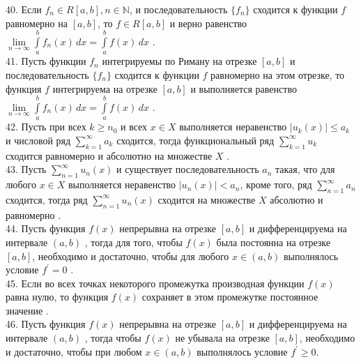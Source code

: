 \documentclass[12pt]{article}
\begin{document}
{{40. Если ${\displaystyle f_n \in R[a,b], n \in \mathbb{N}}$, и последовательность ${\displaystyle \{f_n\}}$ сходится к функции ${\displaystyle f}$ равномерно на ${\displaystyle [a,b]}$, то ${\displaystyle f \in R[a,b]}$ и верно равенство ${\displaystyle \lim \limits _{n \to \infty} \int \limits _{a}^{b} f_n(x) \, dx=\int \limits _{a}^{b} f(x) \, dx}$ .\\

41. Пусть функции ${\displaystyle f_n}$ интегрируемы по Риману на отрезке ${\displaystyle [a,b]}$ и последовательность ${\displaystyle \{f_n\}}$ сходится к функции ${\displaystyle f}$ равномерно на этом отрезке, то функция ${\displaystyle f}$  интегрируема на отрезке ${\displaystyle [a,b]}$ и выполняется равенство ${\displaystyle \lim \limits _{n \to \infty} \int \limits _{a}^{b} f_n(x) \, dx=\int \limits _{a}^{b} f(x) \, dx}$ .\\

42. Пусть при всех ${k \geq n_0}$ и всех ${x \in X}$ выполняется неравенство ${|u_k(x)| \leq a_k}$ и числовой ряд ${\sum _{k=1}^{\infty} a_k}$ сходится, тогда функциональный ряд ${\sum _{k=1}^{\infty} u_k}$ сходится равномерно и абсолютно на множестве ${\displaystyle X}$ .\\

43. Пусть ${\sum _{{n=1}}^{{\infty }} u_{n}(x)}$ и существует последовательность ${\displaystyle a_{n}}$ такая, что для любого ${\displaystyle x\in X}$  выполняется неравенство ${\displaystyle |u_{n}(x)|<a_{n}}$, кроме того, ряд ${\displaystyle \sum _{n=1}^{\infty }a_{n}}$ сходится, тогда ряд ${\displaystyle \sum _{n=1}^{\infty } u_{n}(x)}$ сходится на множестве ${\displaystyle X}$ абсолютно и равномерно .\\

44. Пусть функция ${\displaystyle f(x)}$ непрерывна на отрезке  ${\displaystyle [a,b]}$ и дифференцируема на интервале ${\displaystyle (a,b)}$ , тогда для того, чтобы ${\displaystyle f(x)}$ была постоянна на отрезке ${\displaystyle [a,b]}$, необходимо и достаточно, чтобы для любого ${\displaystyle x \in (a,b)}$ выполнялось условие ${\displaystyle f^{\prime}=0}$ .\\

45. Если во всех точках некоторого промежутка производная функции ${\displaystyle f(x)}$ равна нулю, то функция ${\displaystyle f(x)}$ сохраняет в этом промежутке постоянное значение .\\

46. Пусть функция ${\displaystyle f(x)}$ непрерывна на отрезке  ${\displaystyle [a,b]}$ и дифференцируема на интервале ${\displaystyle (a,b)}$ ,  тогда чтобы ${\displaystyle f(x)}$ не убывала на отрезке ${\displaystyle [a,b]}$, необходимо и достаточно, чтобы при любом ${\displaystyle x \in (a,b)}$ выполнялось условие ${\displaystyle f^{\prime} \geq 0}$.\\

}}
\end{document}
